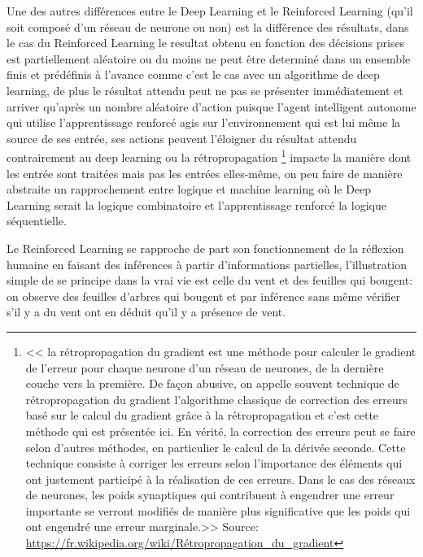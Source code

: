 Une des autres différences entre le Deep Learning et le Reinforced Learning 
(qu'il soit composé d'un réseau de neurone ou non) est la différence des résultats, 
dans le cas du Reinforced Learning le resultat obtenu en fonction des décisions
prises est partiellement aléatoire ou du moins ne peut être determiné dans un ensemble finis 
et prédéfinis à l'avance comme c'est le cas avec un algorithme de deep learning,
de plus le résultat attendu peut ne pas se présenter immédiatement et arriver 
qu'après un nombre aléatoire d'action puisque l'agent intelligent autonome qui utilise 
l'apprentissage renforcé agis sur l'environnement qui est lui même la source de 
ses entrée, ses actions peuvent l'éloigner du résultat attendu contrairement 
au deep learning ou la rétropropagation 
\footnote{<< la rétropropagation du gradient est une méthode pour calculer le gradient de l'erreur 
pour chaque neurone d'un réseau de neurones, de la dernière couche vers la première. 
De façon abusive, on appelle souvent technique de rétropropagation du gradient l'algorithme classique 
de correction des erreurs basé sur le calcul du gradient grâce à la rétropropagation et 
c'est cette méthode qui est présentée ici. En vérité, la correction des erreurs peut se faire selon 
d'autres méthodes, en particulier le calcul de la dérivée seconde. Cette technique consiste à corriger 
les erreurs selon l'importance des éléments qui ont justement participé à la réalisation de ces erreurs. 
Dans le cas des réseaux de neurones, les poids synaptiques qui contribuent à engendrer une 
erreur importante se verront modifiés de manière plus significative que les poids qui ont engendré 
une erreur marginale.>> \newline
Source: \url{https://fr.wikipedia.org/wiki/Rétropropagation_du_gradient}}
impacte la manière dont les entrée 
sont traitées mais pas les entrées elles-même, on peu faire de manière abstraite un rapprochement
entre logique et machine learning où le Deep Learning serait la logique combinatoire et 
l'apprentissage renforcé la logique séquentielle. \newline

Le Reinforced Learning se rapproche de part son fonctionnement de la réflexion humaine en faisant 
des inférences à partir d'informations partielles, l'illustration simple de se principe 
dans la vrai vie est celle du vent et des feuilles qui bougent: 
on observe des feuilles d'arbres qui bougent et par inférence sans même vérifier s'il y a du 
vent ont en déduit qu'il y a présence de vent. 

